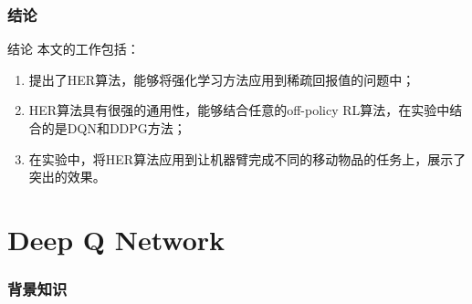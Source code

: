 \documentclass[10pt]{beamer}
\begin{document}
	\section{结论}
	
	\begin{frame}{结论}
		本文的工作包括：
		\begin{enumerate}
			\item<2-> 提出了HER算法，能够将强化学习方法应用到稀疏回报值的问题中；
			\item<3-> HER算法具有很强的通用性，能够结合任意的off-policy RL算法，在实验中结合的是DQN和DDPG方法；
			\item<4-> 在实验中，将HER算法应用到让机器臂完成不同的移动物品的任务上，展示了突出的效果。
		\end{enumerate}
	\end{frame}
		
	\part{Deep Q Network}\label{part:dqn}
	
	\section{背景知识}
	
\end{document}
